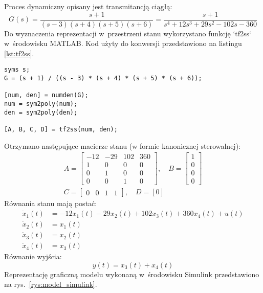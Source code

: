 \documentclass[a4paper,titlepage,11pt,floatssmall]{mwrep} %
\begin{document}
Proces dynamiczny opisany jest transmitancją ciągłą:
\begin{equation}
    G(s) = \frac{s + 1}{(s - 3)(s + 4)(s + 5)(s + 6)} = \frac{s+1}{s^4 + 12s^3 + 29s^2 - 102s - 360}
    \label{eq:transmitancja}
\end{equation}
Do wyznaczenia reprezentacji w~przestrzeni stanu wykorzystano funkcję `tf2ss` w~środowisku MATLAB. Kod użyty do konwersji przedstawiono na listingu \ref{lst:tf2ss}.
\begin{lstlisting}[style=custommatlab, caption={Wyznaczenie modelu w przestrzeni stanu.}, label={lst:tf2ss}]
syms s;
G = (s + 1) / ((s - 3) * (s + 4) * (s + 5) * (s + 6));

[num, den] = numden(G);
num = sym2poly(num);
den = sym2poly(den);

[A, B, C, D] = tf2ss(num, den);
\end{lstlisting}
Otrzymano następujące macierze stanu (w formie kanonicznej sterowalnej):
\begin{gather}
A = \begin{bmatrix} -12 & -29 & 102 & 360 \\ 1 & 0 & 0 & 0 \\ 0 & 1 & 0 & 0 \\ 0 & 0 & 1 & 0 \end{bmatrix}, \quad
B = \begin{bmatrix} 1 \\ 0 \\ 0 \\ 0 \end{bmatrix} \\
C = \begin{bmatrix} 0 & 0 & 1 & 1 \end{bmatrix}, \quad
D = [0]
\end{gather}
Równania stanu mają postać:
\begin{align}
    \dot{x}_1(t) &= -12x_1(t) - 29x_2(t) + 102x_3(t) + 360x_4(t) + u(t) \nonumber \\
    \dot{x}_2(t) &= x_1(t) \nonumber \\
    \dot{x}_3(t) &= x_2(t) \label{eq:rownania_stanu} \\
    \dot{x}_4(t) &= x_3(t) \nonumber
\end{align}
Równanie wyjścia:
\begin{equation}
    y(t) = x_3(t) + x_4(t)
    \label{eq:rownanie_wyjscia}
\end{equation}
Reprezentację graficzną modelu wykonaną w~środowisku Simulink przedstawiono na rys.~\ref{rys:model_simulink}.
\end{document}
